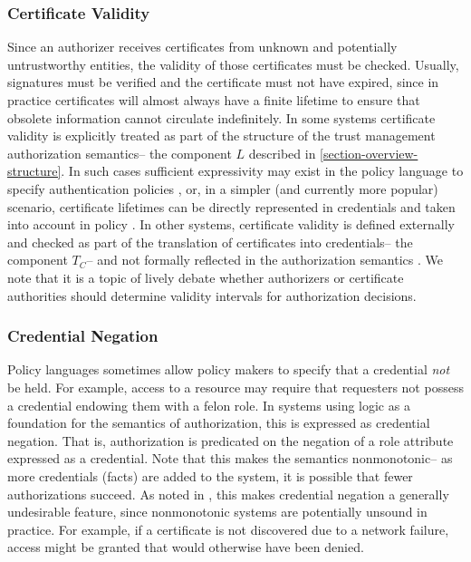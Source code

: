 \subsubsection{Certificate Validity} Since an authorizer receives certificates
from unknown and potentially untrustworthy entities, the validity of
those certificates must be checked.  Usually, signatures must be
verified and the certificate must not have expired, since in practice
certificates will almost always have a finite lifetime to ensure that
obsolete information cannot circulate indefinitely. In some systems
certificate validity is explicitly treated as part of the structure of
the trust management authorization semantics-- the component $L$
described in \autoref{section-overview-structure}.  In such cases
sufficient expressivity may exist in the policy language to specify
authentication policies \cite{Abadi:CACDS}, or, in a simpler (and
currently more popular) scenario, certificate lifetimes can be
directly represented in credentials and taken into account in policy
\cite{Bauer:GFACSW,lbi-fc01,skalka-wang-chapin-jcs06}. In other
systems, certificate validity is defined externally and checked as
part of the translation of certificates into credentials-- the
component $T_C$-- and not formally reflected in the authorization
semantics \cite{RFC-2693}. We note that it is a topic of lively debate
whether authorizers \cite{Rivest:CWECRL} or certificate authorities
\cite{McDaniel:RTCWECRL} should determine validity intervals for
authorization decisions.

\subsubsection{Credential Negation} Policy languages sometimes 
allow policy makers to specify that a credential \emph{not} be held.
For example, access to a resource may require that requesters not
possess a credential endowing them with a felon role.  In systems
using logic as a foundation for the semantics of authorization, this
is expressed as credential negation.  That is, authorization is
predicated on the negation of a role attribute expressed as a
credential.  Note that this makes the semantics nonmonotonic-- as more
credentials (facts) are added to the system, it is possible that fewer
authorizations succeed.  As noted in \cite{seamons-policy02}, this
makes credential negation a generally undesirable feature, since
nonmonotonic systems are potentially unsound in practice.  For example, if a
certificate is not discovered due to a network failure, access might be
granted that would otherwise have been denied.

